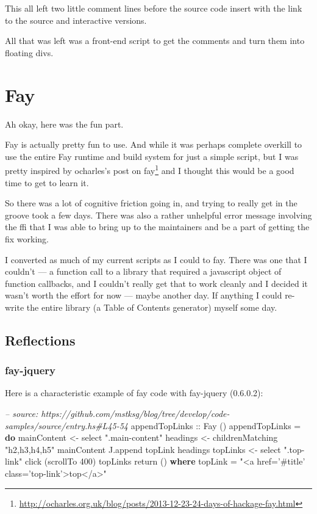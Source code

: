 \documentclass[]{article}
\newenvironment{Shaded}{}{}
\newcommand{\KeywordTok}[1]{\textcolor[rgb]{0.00,0.44,0.13}{\textbf{{#1}}}}
\newcommand{\DataTypeTok}[1]{\textcolor[rgb]{0.56,0.13,0.00}{{#1}}}
\newcommand{\DecValTok}[1]{\textcolor[rgb]{0.25,0.63,0.44}{{#1}}}
\newcommand{\StringTok}[1]{\textcolor[rgb]{0.25,0.44,0.63}{{#1}}}
\newcommand{\CommentTok}[1]{\textcolor[rgb]{0.38,0.63,0.69}{\textit{{#1}}}}
\newcommand{\OtherTok}[1]{\textcolor[rgb]{0.00,0.44,0.13}{{#1}}}
\newcommand{\FunctionTok}[1]{\textcolor[rgb]{0.02,0.16,0.49}{{#1}}}
\newcommand{\NormalTok}[1]{{#1}}
\renewcommand{\href}[2]{#2\footnote{\url{#1}}}
\begin{document}
This all left two little comment lines before the source code insert with the
link to the source and interactive versions.

All that was left was a front-end script to get the comments and turn them into
floating divs.

\section{Fay}\label{fay}

Ah okay, here was the fun part.

Fay is actually pretty fun to use. And while it was perhaps complete overkill to
use the entire Fay runtime and build system for just a simple script, but I was
pretty inspired by
\href{http://ocharles.org.uk/blog/posts/2013-12-23-24-days-of-hackage-fay.html}{ocharles's
post on fay} and I thought this would be a good time to get to learn it.

So there was a lot of cognitive friction going in, and trying to really get in
the groove took a few days. There was also a rather unhelpful error message
involving the ffi that I was able to bring up to the maintainers and be a part
of getting the fix working.

I converted as much of my current scripts as I could to fay. There was one that
I couldn't --- a function call to a library that required a javascript object of
function callbacks, and I couldn't really get that to work cleanly and I decided
it wasn't worth the effort for now --- maybe another day. If anything I could
re-write the entire library (a Table of Contents generator) myself some day.

\subsection{Reflections}\label{reflections-1}

\subsubsection{fay-jquery}\label{fay-jquery}

Here is a characteristic example of fay code with fay-jquery (0.6.0.2):

\begin{Shaded}
\begin{Highlighting}[]
\CommentTok{-- source: https://github.com/mstksg/blog/tree/develop/code-samples/source/entry.hs#L45-54}
\OtherTok{appendTopLinks ::} \DataTypeTok{Fay} \NormalTok{()}
\NormalTok{appendTopLinks }\FunctionTok{=} \KeywordTok{do}
  \NormalTok{mainContent }\OtherTok{<-} \NormalTok{select }\StringTok{".main-content"}
  \NormalTok{headings }\OtherTok{<-} \NormalTok{childrenMatching }\StringTok{"h2,h3,h4,h5"} \NormalTok{mainContent}
  \NormalTok{J.append topLink headings}
  \NormalTok{topLinks }\OtherTok{<-} \NormalTok{select }\StringTok{".top-link"}
  \NormalTok{click (scrollTo }\DecValTok{400}\NormalTok{) topLinks}
  \NormalTok{return ()}
  \KeywordTok{where}
    \NormalTok{topLink }\FunctionTok{=} \StringTok{"<a href='#title' class='top-link'>top</a>"}
\end{Highlighting}
\end{Shaded}
\end{document}

